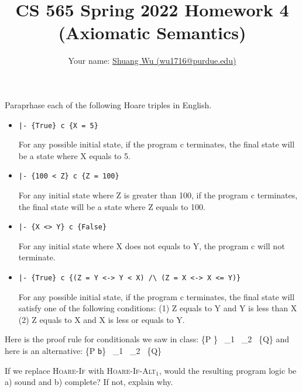 \documentclass[12pt]{article}
\newenvironment{problem}[2][Problem]{\begin{trivlist}
\item[\hskip \labelsep {\bfseries #1}\hskip \labelsep {\bfseries #2.}]}{\end{trivlist}}
\begin{document}
\title{CS 565 Spring 2022 Homework 4 (Axiomatic Semantics)}
\author{Your name: \underline{Shuang Wu (wu1716@purdue.edu)}}
\maketitle

\begin{problem}{1 (2 points)}
Paraprhase each of the following Hoare triples in English.

\begin{itemize}
\item[a. ]   \lstinline!|- {True} c {X = 5}!

For any possible initial state, if the program c terminates, the final state will be a state where X equals to 5.

\item[b. ]   \lstinline!|- {100 < Z} c {Z = 100}!

For any initial state where Z is greater than 100, if the program c terminates, the final state will be a state where Z equals to 100.

\item[c. ]   \lstinline!|- {X <> Y} c {False}!

For any initial state where X does not equals to Y, the program c will not terminate.

\item[d. ]   \lstinline!|- {True} c {(Z = Y <-> Y < X) /\ (Z = X <-> X <= Y)}!

For any possible initial state, if the program c terminates, the final state will satisfy one of the following conditions: (1) Z equals to Y and Y is less than X (2) Z equals to X and X is less or equals to Y.

\end{itemize}
\end{problem}

\pagebreak

\begin{problem}{2 (1 point)}
  Here is the proof rule for conditionals we saw in class:
  {\vdash \{P \}~ _1~ _2  ~\{Q\}}
  \noindent and here is an alternative:
  {\vdash \{P \land \lstinline|b|\}~ _1~ _2  ~\{Q\}}

  If we replace \textsc{Hoare-If} with \textsc{Hoare-If-Alt$_1$},
  would the resulting program logic be a) sound and b) complete?
  If not,  explain why.
  \end{problem}
  
\end{document}
